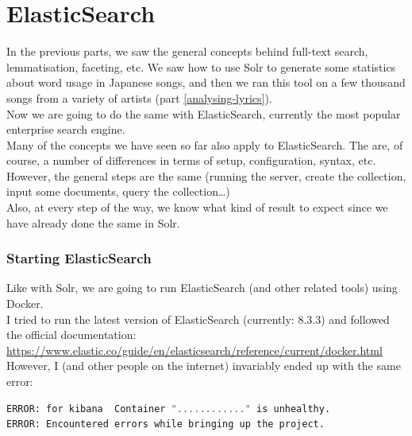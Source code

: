 
\renewcommand{\currentPart}{ElasticSearch}
\part{\currentPart} \label{part - ElasticSearch}


In the previous parts, we saw the general concepts behind full-text search, lemmatisation, faceting, etc. We saw how to use Solr to generate some statistics about word usage in Japanese songs, and then we ran this tool on a few thousand songs from a variety of artists (part \ref{analysing-lyrics}). \\

Now we are going to do the same with ElasticSearch, currently the most popular enterprise search engine. \\

Many of the concepts we have seen so far also apply to ElasticSearch. The are, of course, a number of differences in terms of setup, configuration, syntax, etc. However, the general steps are the same (running the server, create the collection, input some documents, query the collection\dots) \\

Also, at every step of the way, we know what kind of result to expect since we have already done the same in Solr. \\





\section{Starting ElasticSearch} \label{starting-elasticsearch}

Like with Solr, we are going to run ElasticSearch (and other related tools) using Docker. \\



I tried to run the latest version of ElasticSearch (currently: 8.3.3) and followed the official documentation: \\
\url{https://www.elastic.co/guide/en/elasticsearch/reference/current/docker.html} \\

However, I (and other people on the internet) invariably ended up with the same error:
\begin{lstlisting}[language=sh]
ERROR: for kibana  Container "............" is unhealthy.
ERROR: Encountered errors while bringing up the project.
\end{lstlisting}

